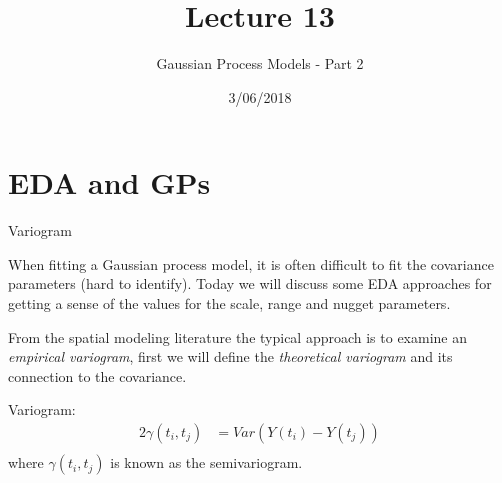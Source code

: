 \documentclass[11pt,ignorenonframetext,]{beamer}
\title{Lecture 13}
\subtitle{Gaussian Process Models - Part 2}
\date{3/06/2018}
\begin{document}
\frame{\titlepage}

\hypertarget{eda-and-gps}{%
\section{EDA and GPs}\label{eda-and-gps}}

\begin{frame}[t]{%
\protect\hypertarget{variogram}{%
Variogram}}

When fitting a Gaussian process model, it is often difficult to fit the
covariance parameters (hard to identify). Today we will discuss some EDA
approaches for getting a sense of the values for the scale, range and
nugget parameters.

\pause

From the spatial modeling literature the typical approach is to examine
an \emph{empirical variogram}, first we will define the
\emph{theoretical variogram} and its connection to the covariance.

\vspace{2mm}

\pause

Variogram: \[ \begin{aligned}
2 \gamma(t_i, t_j) 
  &= Var(Y(t_i) - Y(t_j)) \\
\end{aligned}\] where \(\gamma(t_i, t_j)\) is known as the
semivariogram.

\end{frame}
\end{document}
